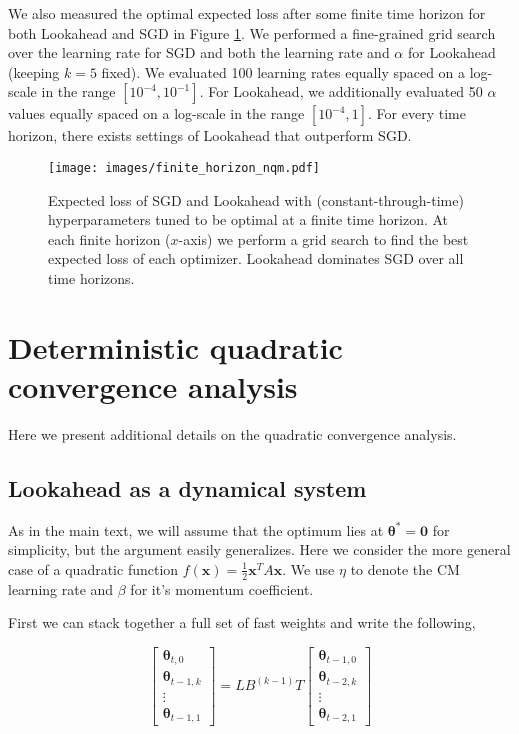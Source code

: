 \documentclass{article}
\newcommand{\bx}{\mathbf{x}}
\newcommand{\btheta}{\boldsymbol{\theta}}
\begin{document}
We also measured the optimal expected loss after some finite time horizon for both Lookahead and SGD in Figure \ref{fig:finite_horizon_nqm}. We performed a fine-grained grid search over the learning rate for SGD and both the learning rate and $\alpha$ for Lookahead (keeping $k=5$ fixed). We evaluated 100 learning rates equally spaced on a log-scale in the range $[10^{-4},10^{-1}]$. For Lookahead, we additionally evaluated 50 $\alpha$ values equally spaced on a log-scale in the range $[10^{-4}, 1]$. For every time horizon, there exists settings of Lookahead that outperform SGD.



\begin{figure}
    \centering
    \texttt{[image: images/finite\_horizon\_nqm.pdf]}
    \caption{Expected loss of SGD and Lookahead with (constant-through-time) hyperparameters tuned to be optimal at a finite time horizon. At each finite horizon ($x$-axis) we perform a grid search to find the best expected loss of each optimizer. Lookahead dominates SGD over all time horizons.}
    \label{fig:finite_horizon_nqm}
\end{figure}
 \section{Deterministic quadratic convergence analysis}
\label{app:quadratic}

Here we present additional details on the quadratic convergence analysis.

\subsection{Lookahead as a dynamical system}

As in the main text, we will assume that the optimum lies at $\btheta^* = \mathbf{0}$ for simplicity, but the argument easily generalizes. Here we consider the more general case of a quadratic function $f(\bx) = \frac{1}{2} \bx^T A \bx$. We use $\eta$ to denote the CM learning rate and $\beta$ for it's momentum coefficient.

First we can stack together a full set of fast weights and write the following,

\[ 
\left[\begin{array}{c}
\btheta_{t,0} \\
\btheta_{t-1, k} \\
\vdots \\
\btheta_{t-1, 1}
\end{array}\right] = LB^{(k-1)}T \left[\begin{array}{c} \btheta_{t-1, 0} \\
\btheta_{t-2, k} \\
\vdots \\
\btheta_{t-2, 1}
\end{array}\right]
\]
\end{document}
